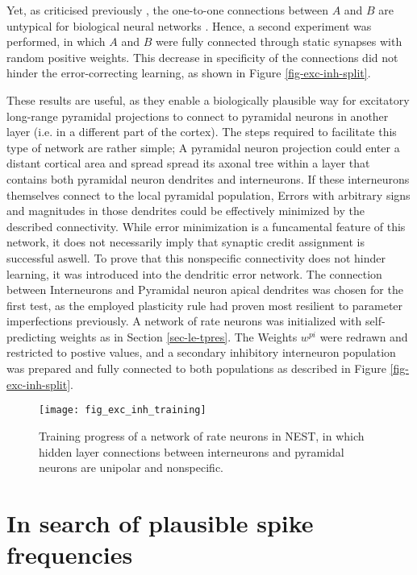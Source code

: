 Yet, as criticised previously \citep{whittington2019theories}, the one-to-one connections between $A$ and $B$ are
untypical for biological neural networks \citeme. Hence, a second experiment was performed, in which $A$ and $B$ were
fully connected through static synapses with random positive weights. This decrease in specificity of the connections
did not hinder the error-correcting learning, as shown in Figure \ref{fig-exc-inh-split}.

These results are useful, as they enable a biologically plausible way for excitatory long-range pyramidal projections to
connect to pyramidal neurons in another layer (i.e. in a different part of the cortex). The steps required to facilitate
this type of network are rather simple; A pyramidal neuron projection could enter a distant cortical area and spread
spread its axonal tree \phrasing within a layer that contains both pyramidal neuron dendrites and interneurons. If these
interneurons themselves connect to the local pyramidal population, Errors with arbitrary signs and magnitudes in those
dendrites could be effectively minimized by the described connectivity. While error minimization is a funcamental
feature of this network, it does not necessarily imply that synaptic credit assignment is successful aswell. To prove
that this nonspecific connectivity does not hinder learning, it was introduced into the dendritic error network. The
connection between Interneurons and Pyramidal neuron apical dendrites was chosen for the first test, as the employed
plasticity rule had proven most resilient to parameter imperfections previously. A network of rate neurons was
initialized with self-predicting weights as in Section \ref{sec-le-tpres}. The Weights $w^{pi}$ were redrawn and
restricted to postive values, and a secondary inhibitory interneuron population was prepared and fully connected to both
populations as described in Figure \ref{fig-exc-inh-split}. 


\begin{figure}[t]
    \centering
    \texttt{[image: fig\_exc\_inh\_training]}
    \caption{Training progress of a network of rate neurons in NEST, in which hidden layer connections between
    interneurons and pyramidal neurons are unipolar and nonspecific.}
    \label{fig-exc-inh-training}
\end{figure}


\section{In search of plausible spike frequencies}


